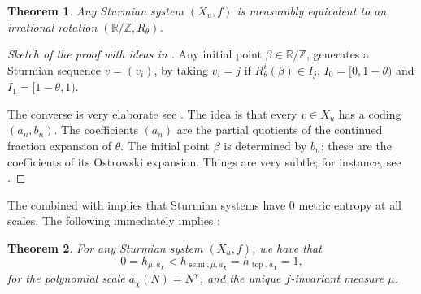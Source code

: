 \documentclass[oneside]{amsart}
\theoremstyle{plain}
\newtheorem{THM}{Theorem}[section]
\theoremstyle{definition}
\newcommand{\<}{\langle}
\renewcommand{\>}{\rangle}
\newcommand{\R}{\mathbb{R}}
\newcommand{\Z}{\mathbb{Z}}
\newcommand{\topo}{\operatorname{top}}
\renewcommand{\|}{|\!|} %
\newcommand{\semitop}{\operatorname{semi}} %
\begin{document}
\begin{THM}
    Any Sturmian system $(X_u,f)$ is measurably equivalent to an irrational rotation $(\R/\Z, R_{\theta})$.
    \label{thm:Equiv2Rot}
\end{THM}
\begin{proof}[{Sketch of the proof with ideas in \cite[Chapter 6]{Pytheas}}
]
   Any initial point $\beta \in \R/\Z$, generates a Sturmian sequence $v = (v_i)$, by taking $v_i = j$ if $R_\theta^i(\beta) \in I_j$, $I_0=[0,1-\theta)$ and $I_1=[1-\theta,1)$.

   The converse is very elaborate see \cite[Sections 6.3 and 6.4]{Pytheas}. The idea is that every $v \in X_u$ has a coding $(a_n,b_n)$. The coefficients $(a_n)$ are the partial quotients of the continued fraction expansion of $\theta$. The initial point $\beta$ is determined by $b_n$; these are the coefficients of its Ostrowski expansion. Things are very subtle; for instance, see \cite[Exercise 6.2.13 item 5]{Pytheas}. 
\end{proof}

The  combined with  implies that Sturmian systems have 0 metric entropy at all scales.
The following immediately implies :

\begin{THM}
\label{Sturmian}
    For any Sturmian system $(X_u,f)$, we have that 
    \begin{equation*}
        0=h_{\mu,a_\chi}<h_{\semitop,\mu,a_\chi}=h_{\topo,a_\chi}=1,
    \end{equation*}
    for the polynomial scale $a_\chi(N)=N^\chi$, and the unique $f$-invariant measure $\mu$.
\end{THM}
\end{document}
